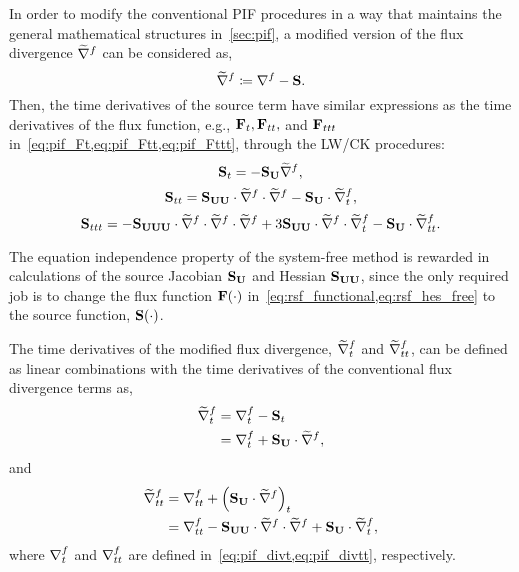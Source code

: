 In order to modify the conventional PIF procedures
in a way that maintains the general mathematical structures
in~\cref{sec:pif},
a modified version of the flux divergence \( \widetilde{\nabla}^{f} \) can be considered as,
\begin{equation}\label{eq:sf_source_divs}
    \widetilde{\nabla}^{f} \coloneqq \nabla^{f} - \mathbf{S}.
\end{equation}
Then, the time derivatives of the source term have similar expressions
as the time derivatives of the flux function,
e.g., \( \mathbf{F}_{t}, \mathbf{F}_{tt}, \) and \( \mathbf{F}_{ttt} \) in~\cref{eq:pif_Ft,eq:pif_Ftt,eq:pif_Fttt},
through the LW/CK procedures:
\begin{equation}\label{eq:sf_source_St}
    \mathbf{S}_{t} = -\mathbf{S}_{\mathbf{U}} \widetilde{\nabla}^{f},
\end{equation}
\begin{equation}\label{eq:sf_source_Stt}
    \mathbf{S}_{tt} = \mathbf{S}_{\mathbf{U} \mathbf{U}} \cdot \widetilde{\nabla}^{f} \cdot \widetilde{\nabla}^{f} - \mathbf{S}_{\mathbf{U}} \cdot \widetilde{\nabla}^{f}_{t},
\end{equation}
\begin{equation}\label{eq:sf_source_Sttt}
    \mathbf{S}_{ttt} = -\mathbf{S}_{\mathbf{U} \mathbf{U} \mathbf{U}} \cdot \widetilde{\nabla}^{f} \cdot \widetilde{\nabla}^{f} \cdot \widetilde{\nabla}^{f}
    + 3 \mathbf{S}_{\mathbf{U} \mathbf{U}} \cdot \widetilde{\nabla}^{f} \cdot \widetilde{\nabla}^{f}_{t}
    - \mathbf{S}_{\mathbf{U}} \cdot \widetilde{\nabla}^{f}_{tt}.
\end{equation}

The equation independence property of the system-free method
is rewarded in calculations of the source Jacobian \( \mathbf{S}_{\mathbf{U}} \) and Hessian \( \mathbf{S}_{\mathbf{U}\mathbf{U}} \),
since the only required job is to change the flux function \( \mathbf{F}(\cdot) \)
in~\cref{eq:rsf_functional,eq:rsf_hes_free} to the source function, \( \mathbf{S}(\cdot) \).

The time derivatives of the modified flux divergence, \( \widetilde{\nabla}^{f}_{t} \) and \( \widetilde{\nabla}^{f}_{tt} \),
can be defined as linear combinations with the time derivatives of the conventional
flux divergence terms as,
\begin{equation}\label{eq:sf_source_divst}
    \begin{split}
        \widetilde{\nabla}^{f}_{t} &= \nabla^{f}_{t} - \mathbf{S}_{t} \\
                  &= \nabla^{f}_{t} + \mathbf{S}_{\mathbf{U}} \cdot \widetilde{\nabla}^{f},
    \end{split}
\end{equation}
and
\begin{equation}\label{eq:sf_source_divstt}
    \begin{split}
        \widetilde{\nabla}^{f}_{tt} &= \nabla^{f}_{tt} + \left( \mathbf{S}_{\mathbf{U}} \cdot \widetilde{\nabla}^{f} \right)_{t} \\
                   &= \nabla^{f}_{tt} - \mathbf{S}_{\mathbf{U}\mathbf{U}} \cdot \widetilde{\nabla}^{f} \cdot \widetilde{\nabla}^{f} + \mathbf{S}_{\mathbf{U}} \cdot \widetilde{\nabla}^{f}_{t},
    \end{split}
\end{equation}
where \( \nabla^{f}_{t} \) and \( \nabla^{f}_{tt} \) are defined in~\cref{eq:pif_divt,eq:pif_divtt}, respectively.


